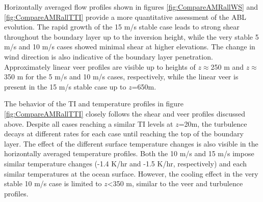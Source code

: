 Horizontally averaged flow profiles shown in figures
\ref{fig:CompareAMRallWS} and \ref{fig:CompareAMRallTTI} provide a
more quantitative assessment of the ABL evolution.  The rapid growth
of the 15 m/s stable case leads to strong shear throughout the
boundary layer up to the inversion height, while the very stable 5 m/s
and 10 m/s cases showed minimal shear at higher elevations.  The
change in wind direction is also indicative of the boundary layer
penetration.  Approximately linear veer profiles are visible up to
heights of $z\approx$250 m and $z\approx$350 m for the 5 m/s and 10
m/s cases, respectively, while the linear veer is present in the 15
m/s stable case up to $z$=650m.

The behavior of the TI and temperature profiles in figure
\ref{fig:CompareAMRallTTI} closely follows the shear and veer profiles
discussed above.  Despite all cases reaching a similar TI levels at
$z$=20m, the turbulence decays at different rates for each case until
reaching the top of the boundary layer.  The effect of the different
surface temperature changes is also visible in the horizontally
averaged temperature profiles.  Both the 10 m/s and 15 m/s impose
similar temperature changes (-1.4 K/hr and -1.5 K/hr, respectively)
and each similar temperatures at the ocean surface.  However, the
cooling effect in the very stable 10 m/s case is limited to $z$<350
m, similar to the veer and turbulence profiles.

